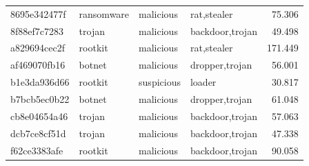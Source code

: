 \begin{table}[htbp]
\begin{tabular}{l l l l r}
            8695e342477f         & ransomware               & malicious              & rat,stealer                       & 75.306                         \\
            8f88ef7c7283         & trojan                   & malicious              & backdoor,trojan                   & 49.498                         \\
            a829694cec2f         & rootkit                  & malicious              & rat,stealer                       & 171.449                        \\
            af469070fb16         & botnet                   & malicious              & dropper,trojan                    & 56.001                         \\
            b1e3da936d66         & rootkit                  & suspicious             & loader                            & 30.817                         \\
            b7bcb5ec0b22         & botnet                   & malicious              & dropper,trojan                    & 61.048                         \\
            cb8e04654a46         & trojan                   & malicious              & backdoor,trojan                   & 57.063                         \\
            dcb7ce8cf51d         & trojan                   & malicious              & backdoor,trojan                   & 47.338                         \\
            f62ce3383afe         & rootkit                  & malicious              & backdoor,trojan                   & 90.058                         \\
            \hline
      \end{tabular}
\end{table}

\FloatBarrier

